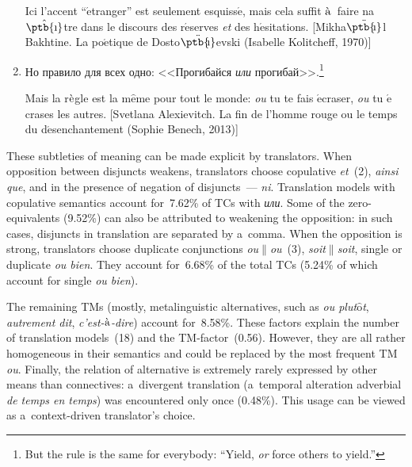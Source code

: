 \begin{multicols}{2}
\begin{enumerate}[(1)]
Ici l'accent ``$\acute{\mbox{e}}$tranger'' est seulement 
esquiss$\acute{\mbox{e}}$, mais cela suffit $\Grave{\mbox{a}}$~faire 
na$\hat{\mbox{\ptb{\i}}}$tre dans le discours des r$\acute{\mbox{e}}$serves 
\textit{et} des h$\acute{\mbox{e}}$sitations. 
[{\mbox{Mikha{$\ddot{\mbox{\ptb{\!\i}}}$l}}} Bakhtine. La 
po$\acute{\mbox{e}}$tique de \mbox{Dosto{$\ddot{\mbox{\ptb{\hspace*{-0.3pt}\!\i}}}$}evski} 
(Isabelle Kolitcheff, 1970)]

\item Но правило для всех одно: <<Прогибайся \textit{или} 
прогибай>>.\footnote{But the rule is the same for everybody: ``Yield, \textit{or} force others to 
yield.''}   

Mais la r$\Grave{\mbox{e}}$gle est la m$\hat{\mbox{e}}$me pour tout le 
monde: \textit{ou} tu te fais $\acute{\mbox{e}}$craser, \textit{ou} tu 
$\acute{\mbox{e}}$crases les autres. [Svetlana Alexievitch. La fin de l'homme 
rouge ou le temps du d$\acute{\mbox{e}}$senchantement (Sophie Benech, 
2013)]
\end{enumerate}

  These subtleties of meaning can be made explicit by translators. When opposition 
between disjuncts weakens, translators choose copulative \textit{et}~(2), \textit{ainsi 
que}, and in the presence of negation of disjuncts~--- \textit{ni}. Translation models 
with copulative semantics account for~7.62\% of TCs with \textit{или}. Some of the 
zero-equivalents (9.52\%) can also be attributed to weakening the opposition: in such 
cases, disjuncts in translation are separated by a~comma. When the opposition is 
strong, translators choose duplicate conjunctions \textit{ou}$\|$\textit{ou}~(3), 
\textit{soit}$\|$\textit{soit}, single or duplicate \textit{ou bien}. They account 
for~6.68\% of the total TCs (5.24\% of which account for single \textit{ou bien}).
  
  The remaining TMs (mostly, metalinguistic alternatives, such as 
\textit{ou plut$\hat{\mbox{o}}$t}, \textit{autrement dit},  
\textit{c'est-$\Grave{\mbox{a}}$-dire}) account for~8.58\%. These factors explain the 
number of translation models~(18) and the TM-factor~(0.56). However, they are all 
rather homogeneous in their semantics and could be replaced by the most frequent 
TM \textit{ou}. Finally, the relation of alternative is extremely rarely 
expressed by other means than connectives: a~divergent translation (a~temporal 
alteration adverbial \textit{de temps en temps}) was encountered only once (0.48\%). 
This usage can be viewed as a~context-driven translator's choice.
  

\end{multicols}
